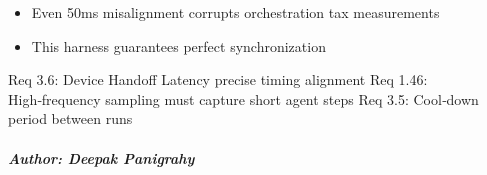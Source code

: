 \documentclass[letterpaper,10pt,english]{sphinxmanual}
\begin{document}
\begin{description}
\begin{itemize}
\item {} 
\sphinxAtStartPar
Even 50ms misalignment corrupts orchestration tax measurements

\item {} 
\sphinxAtStartPar
This harness guarantees perfect synchronization

\end{itemize}

\sphinxAtStartPar
Req 3.6: Device Handoff Latency \textendash{} precise timing alignment
Req 1.46: High‑frequency sampling \textendash{} must capture short agent steps
Req 3.5: Cool‑down period between runs

\end{description}


\subparagraph{Author: Deepak Panigrahy}
\label{\detokenize{core.execution.harness:author-deepak-panigrahy}}
\end{document}
